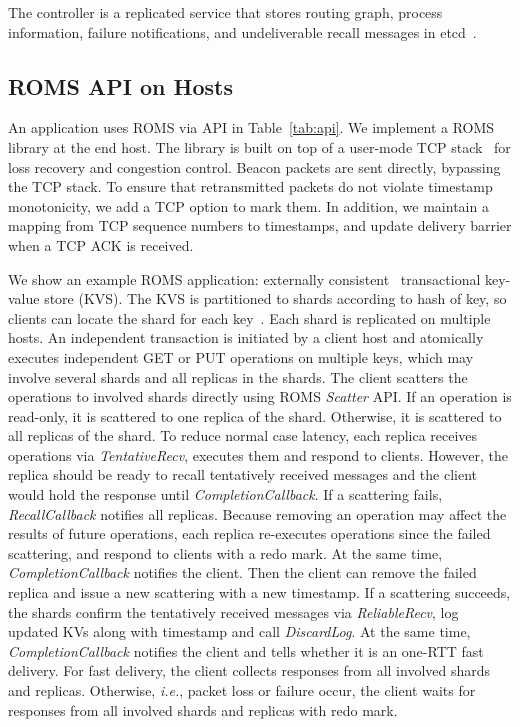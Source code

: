The controller is a replicated service that stores routing graph, process information, failure notifications, and undeliverable recall messages in etcd~\cite{etcd}.


\iffalse
\subsection{ROMS API on Hosts}
\label{sec:api}

An application uses ROMS via API in Table~\ref{tab:api}.
We implement a ROMS library at the end host. The library is built on top of a user-mode TCP stack~\cite{libvma,dunkels2001design} for loss recovery and congestion control. Beacon packets are sent directly, bypassing the TCP stack. To ensure that retransmitted packets do not violate timestamp monotonicity, we add a TCP option to mark them. In addition, we maintain a mapping from TCP sequence numbers to timestamps, and update delivery barrier when a TCP ACK is received.

We show an example ROMS application: externally consistent~\cite{corbett2013spanner} transactional key-value store (KVS).
The KVS is partitioned to shards according to hash of key, so clients can locate the shard for each key~\cite{nishtala2013scaling,eris}.
Each shard is replicated on multiple hosts.
An independent transaction is initiated by a client host and atomically executes independent GET or PUT operations on multiple keys, which may involve several shards and all replicas in the shards.
The client scatters the operations to involved shards directly using ROMS \emph{Scatter} API.
If an operation is read-only, it is scattered to one replica of the shard. Otherwise, it is scattered to all replicas of the shard.
To reduce normal case latency, each replica receives operations via \emph{TentativeRecv}, executes them and respond to clients.
However, the replica should be ready to recall tentatively received messages and the client would hold the response until \emph{CompletionCallback}.
If a scattering fails, \emph{RecallCallback} notifies all replicas.
Because removing an operation may affect the results of future operations, each replica re-executes operations since the failed scattering, and respond to clients with a redo mark.
At the same time, \emph{CompletionCallback} notifies the client. Then the client can remove the failed replica and issue a new scattering with a new timestamp.
If a scattering succeeds, the shards confirm the tentatively received messages via \emph{ReliableRecv}, log updated KVs along with timestamp and call \emph{DiscardLog}.
At the same time, \emph{CompletionCallback} notifies the client and tells whether it is an one-RTT fast delivery.
For fast delivery, the client collects responses from all involved shards and replicas.
Otherwise, \emph{i.e.}, packet loss or failure occur, the client waits for responses from all involved shards and replicas with redo mark.

